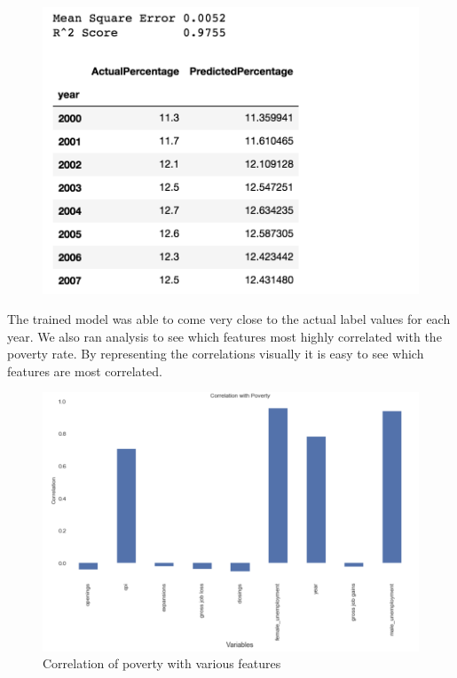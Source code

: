 \documentclass[11pt,letterpaper]{article}
\begin{document}
\begin{figure}[h]
	\includegraphics[width=\linewidth]{"./pictures/Mse_Score_Predictions"}
\end{figure}

The trained model was able to come very close to the actual label values for each year. We also ran analysis to see which features most highly correlated with the poverty rate. By representing the correlations visually it is easy to see which features are most correlated. 

\begin{figure}[h]
	\includegraphics[width=\linewidth]{"./pictures/Correlation_With_Poverty"}
	\caption{Correlation of poverty with various features}
    \label{fig:Feature Correlation}
\end{figure}
\end{document}
